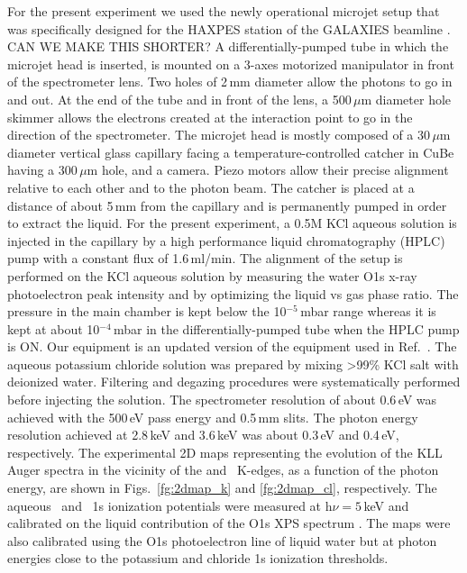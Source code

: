 
For the present experiment we used the newly operational microjet setup that was specifically designed for the HAXPES station of the GALAXIES beamline \citep{ceolin13:188,rueff15:175}. {\color{red}CAN WE MAKE THIS SHORTER? A differentially-pumped tube in which the microjet head is inserted, is mounted on a 3-axes motorized manipulator in front of the spectrometer lens. Two holes of 2\,mm diameter allow the photons to go in and out. At the end of the tube and in front of the lens, a 500\,$\mu$m diameter hole skimmer allows the electrons created at the interaction point to go in the direction of the spectrometer. The microjet head is mostly composed of a 30\,$\mu$m diameter vertical glass capillary facing a temperature-controlled catcher in CuBe having a 300\,$\mu$m hole, and a camera. Piezo motors allow their precise alignment relative to each other and to the photon beam. The catcher is placed at a distance of about 5\,mm from the capillary and is permanently pumped in order to extract the liquid. For the present experiment, a 0.5M KCl aqueous solution is injected in the capillary by a high performance liquid chromatography (HPLC) pump with a constant flux of 1.6\,ml/min. The alignment of the setup is performed on the KCl aqueous solution by measuring the water O1s x-ray photoelectron peak intensity and by optimizing the liquid vs gas phase ratio. The pressure in the main chamber is kept below the 10$^{-5}$\,mbar range whereas it is kept at about 10$^{-4}$\,mbar in the differentially-pumped tube when the HPLC pump is ON. Our equipment is an updated version of the equipment used in Ref.\ \cite{faubel88:269}.} The aqueous potassium chloride solution was prepared by mixing >99\% KCl salt with deionized water. Filtering and degazing procedures were systematically performed before injecting the solution. The spectrometer resolution of about 0.6\,eV was achieved with the 500\,eV pass energy and 0.5\,mm slits. The photon energy resolution achieved at 2.8\,keV and 3.6\,keV was about 0.3\,eV and 0.4\,eV, respectively. The experimental 2D maps representing the evolution of the KLL Auger spectra in the vicinity of the \cli and \ki~K-edges, as a function of the photon energy, are shown in Figs.\ \ref{fg:2dmap_k} and \ref{fg:2dmap_cl}, respectively. The aqueous \ki~and \cli~1s ionization potentials were measured at h$\nu = 5$\,keV and calibrated on the liquid contribution of the O1s XPS spectrum \cite{winter06:1176}. The maps were also calibrated using the O1s photoelectron line of liquid water but at photon energies close to the potassium and chloride 1s ionization thresholds.


